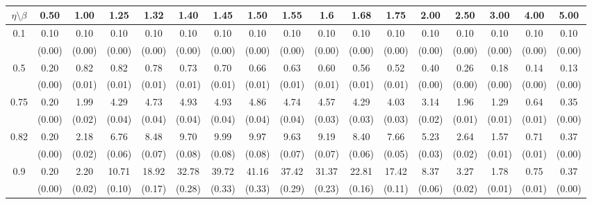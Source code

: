 \documentclass[12pt]{article}  %
\theoremstyle{plain}
\begin{document}
\begin{sidewaystable}[htbp]
\centering
{} 
\label{ATS_10-7}
\ \\
\begin{tabular}{ccccccccccccccccc}
\hline
$\eta \setminus \beta $        & 0.50   & 1.00   & 1.25   & 1.32   & 1.40   & 1.45   & 1.50   & 1.55   & 1.6   & 1.68   & 1.75   & 2.00   & 2.50   & 3.00   & 4.00  &5.00 \\ \hline
\multirow{2}{*}{0.1}  & 0.10& 0.10& 0.10 & 0.10 & 0.10 &  0.10  & 0.10  & 0.10  & 0.10 & 0.10 & 0.10 & 0.10 & 0.10 & 0.10 & 0.10 & 0.10\\
                      & (0.00) & (0.00) & (0.00) & (0.00) & (0.00) & (0.00) & (0.00) & (0.00) & (0.00) & (0.00) & (0.00) & (0.00) & (0.00) & (0.00) & (0.00) & (0.00)\\ \hline
\multirow{2}{*}{0.5}  &0.20 &0.82 & 0.82 & 0.78 & 0.73 &  0.70  & 0.66 &  0.63  & 0.60  &0.56 & 0.52 & 0.40 & 0.26 & 0.18 & 0.14 & 0.13 \\
                      & (0.00) & (0.01) & (0.01) & (0.01) & (0.01) & (0.01) & (0.01) & (0.01) & (0.01) & (0.01) & (0.01) & (0.00)  & (0.00) & (0.00) & (0.00)&(0.00)\\ \hline
\multirow{2}{*}{0.75}  & 0.20& 1.99 & 4.29 & 4.73 & 4.93 &  4.93  & 4.86  & 4.74  & 4.57 & 4.29 & 4.03 & 3.14 & 1.96 & 1.29 & 0.64 & 0.35\\
                      & (0.00)& (0.02)& (0.04)& (0.04)& (0.04)& (0.04)& (0.04)& (0.04)& (0.03)&  (0.03)&  (0.03)&  (0.02)&  (0.01)&  (0.01)&  (0.01) & (0.00)\\ \hline
\multirow{2}{*}{0.82}  &0.20& 2.18 & 6.76 & 8.48 & 9.70  & 9.99  & 9.97 &  9.63  & 9.19 & 8.40 & 7.66 & 5.23 & 2.64 & 1.57 & 0.71 & 0.37\\
                      & (0.00)& (0.02)& (0.06)& (0.07)& (0.08)& (0.08)& (0.08)& (0.07)& (0.07)&  (0.06)&  (0.05)&  (0.03)&  (0.02)&  (0.01)&  (0.01)& (0.00)\\ \hline
\multirow{2}{*}{0.9}  & 0.20& 2.20& 10.71 &18.92 &32.78 & 39.72 & 41.16&  37.42 & 31.37& 22.81& 17.42&  8.37 & 3.27 & 1.78 & 0.75 & 0.37\\
                      & (0.00)& (0.02)& (0.10)& (0.17)& (0.28)& (0.33)& (0.33)& (0.29)& (0.23)&  (0.16)&  (0.11)&  (0.06)&  (0.02)&  (0.01)&  (0.01)& (0.00)\\ \hline                                               

\end{tabular}
\end{sidewaystable}
\end{document}
